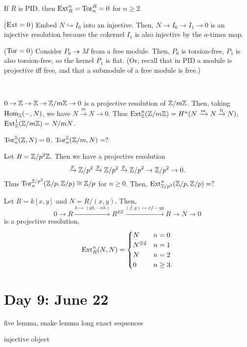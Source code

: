 \documentclass{../../../small}
\begin{document}
\begin{prop*}[2.4.8]
If $R$ is PID, then $\operatorname{Ext}_R^n=\operatorname{Tor}^R_n=0$ for $n\ge2$.
\end{prop*}
\begin{pf}
($\operatorname{Ext}=0$)
Embed $N\hookrightarrow I_0$ into an injective.
Then, $N\to I_0\to I_1\to0$ is an injective resolution because the cokernel $I_1$ is also injective by the $a$-times map.

($\operatorname{Tor}=0$)
Consider $P_0\twoheadrightarrow M$ from a free module.
Then, $P_0$ is torsion-free, $P_1$ is also torsion-free, so the kernel $P_1$ is flat.
(Or, recall that in PID a module is projective iff free, and that a submodule of a free module is free.)
\end{pf}
\begin{ex*}\,
\begin{parts}
\item $0\to\mathbb{Z}\to\mathbb{Z}\to\mathbb{Z}/m\mathbb{Z}\to0$ is a projective resolution of $\mathbb{Z}/m\mathbb{Z}$.
Then, taking $\operatorname{Hom}_{\mathbb{Z}}(-,N)$, we have $N\xrightarrow{m}N\to0$.
Thus $\operatorname{Ext}_{\mathbb{Z}}^n(\mathbb{Z}/m\mathbb{Z})=H^n(N\xrightarrow{m}N\xrightarrow{0}N)$, $\operatorname{Ext}_{\mathbb{Z}}^1(\mathbb{Z}/m\mathbb{Z})=N/mN$.
\item 
$\operatorname{Tor}_n^{\mathbb{Z}}(\mathbb{Z},N)=0$, $\operatorname{Tor}_n^{\mathbb{Z}}(\mathbb{Z}/m,N)=?$
\item
Let $R=\mathbb{Z}/p^2\mathbb{Z}$.
Then we have a projective resolution
\[\xrightarrow{p}\mathbb{Z}/p^2\xrightarrow{p}\mathbb{Z}/p^2\xrightarrow{p}\mathbb{Z}/p^2\to\mathbb{Z}/p^2\to0.\]
Thus $\operatorname{Tor}_n^{\mathbb{Z}/p^2}(\mathbb{Z}/p,\mathbb{Z}/p)\cong\mathbb{Z}/p$ for $n\ge0$.
Then, $\operatorname{Ext}_{\mathbb{Z}/p^2}^n(\mathbb{Z}/p,\mathbb{Z}/p)=?$
\item
Let $R=k[x,y]$ and $N=R/(x,y)$.
Then,
\[0\to R\xrightarrow{h\mapsto(yh,-xh)}R^{\oplus2}\xrightarrow{(f,g)\mapsto xf-yg}R\to N\to 0\]
is a projective resolution,
\[\operatorname{Ext}_R^n(N,N)=\begin{cases}N&n=0\\N^{\oplus2}&n=1\\N&n=2\\0&n\ge3.\end{cases}\]
\end{parts}
\end{ex*}



\newpage
\setcounter{section}{8}
\section{Day 9: June 22}


five lemma, snake lemma
long exact sequences

injective object
\end{document}
